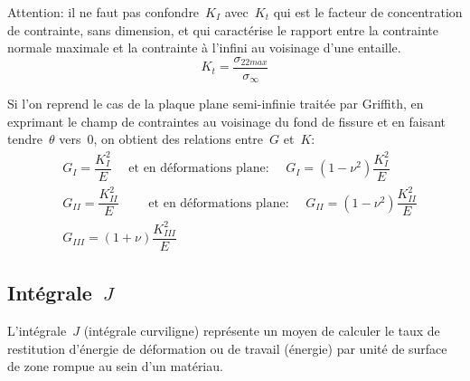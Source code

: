 \medskip
{}
Attention: il ne faut pas confondre~$K_I$ avec~$K_t$ qui est le facteur de concentration de contrainte, sans dimension, et qui caractérise le rapport entre la contrainte normale maximale et la contrainte à l'infini au voisinage d'une entaille.
\begin{equation} K_t = \dfrac{\sigma_{22 max}}{\sigma_\infty} \end{equation}

\medskip
Si l'on reprend le cas de la plaque plane semi-infinie traitée par Griffith, en exprimant le champ de contraintes au voisinage du fond de fissure et en faisant tendre~$\theta$ vers~$0$, on obtient des relations entre~$G$ et~$K$:
\begin{align}
&G_I = \dfrac{K_I^2}E \quad \text{ et en déformations plane: }\quad
G_I = (1-\nu^2)\dfrac{K_I^2}E \\
&G_{II} = \dfrac{K_{II}^2}E \qquad \text{ et en déformations plane: }\quad
G_{II} = (1-\nu^2)\dfrac{K_{II}^2}E \\
&G_{III} = (1+\nu)\dfrac{K_{III}^2}E
\end{align}

\medskip
\subsection{Intégrale~$J$}

\medskip
L'intégrale~$J$ (intégrale curviligne) représente un moyen de calculer le taux de restitution d'énergie de déformation ou de travail (énergie) par unité de surface de zone rompue au sein d'un matériau.


